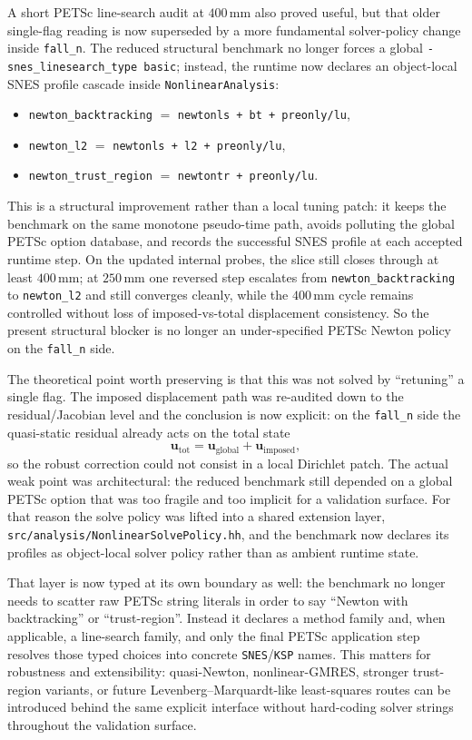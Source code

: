 A short PETSc line-search audit at \(400\,\mathrm{mm}\) also proved useful,
but that older single-flag reading is now superseded by a more fundamental
solver-policy change inside \texttt{fall\_n}. The reduced structural benchmark
no longer forces a global \texttt{-snes\_linesearch\_type basic}; instead, the
runtime now declares an object-local SNES profile cascade inside
\texttt{NonlinearAnalysis}:
\begin{itemize}
  \item \texttt{newton\_backtracking} \(=\)
    \texttt{newtonls + bt + preonly/lu},
  \item \texttt{newton\_l2} \(=\)
    \texttt{newtonls + l2 + preonly/lu},
  \item \texttt{newton\_trust\_region} \(=\)
    \texttt{newtontr + preonly/lu}.
\end{itemize}
This is a structural improvement rather than a local tuning patch: it keeps
the benchmark on the same monotone pseudo-time path, avoids polluting the
global PETSc option database, and records the successful SNES profile at each
accepted runtime step. On the updated internal probes, the slice still closes
through at least \(400\,\mathrm{mm}\); at \(250\,\mathrm{mm}\) one reversed
step escalates from \texttt{newton\_backtracking} to \texttt{newton\_l2} and
still converges cleanly, while the \(400\,\mathrm{mm}\) cycle remains
controlled without loss of imposed-vs-total displacement consistency. So the
present structural blocker is no longer an under-specified PETSc Newton policy
on the \texttt{fall\_n} side.

The theoretical point worth preserving is that this was not solved by
``retuning'' a single flag.  The imposed displacement path was re-audited down
to the residual/Jacobian level and the conclusion is now explicit: on the
\texttt{fall\_n} side the quasi-static residual already acts on the total
state
\[
\mathbf{u}_{\mathrm{tot}}=
\mathbf{u}_{\mathrm{global}}+\mathbf{u}_{\mathrm{imposed}},
\]
so the robust correction could not consist in a local Dirichlet patch.  The
actual weak point was architectural: the reduced benchmark still depended on a
global PETSc option that was too fragile and too implicit for a validation
surface.  For that reason the solve policy was lifted into a shared extension
layer, \texttt{src/analysis/NonlinearSolvePolicy.hh}, and the benchmark now
declares its profiles as object-local solver policy rather than as ambient
runtime state.

That layer is now typed at its own boundary as well: the benchmark no longer
needs to scatter raw PETSc string literals in order to say ``Newton with
backtracking'' or ``trust-region''.  Instead it declares a method family and,
when applicable, a line-search family, and only the final PETSc application
step resolves those typed choices into concrete \texttt{SNES}/\texttt{KSP}
names.  This matters for robustness and extensibility: quasi-Newton,
nonlinear-GMRES, stronger trust-region variants, or future
Levenberg--Marquardt-like least-squares routes can be introduced behind the
same explicit interface without hard-coding solver strings throughout the
validation surface.

